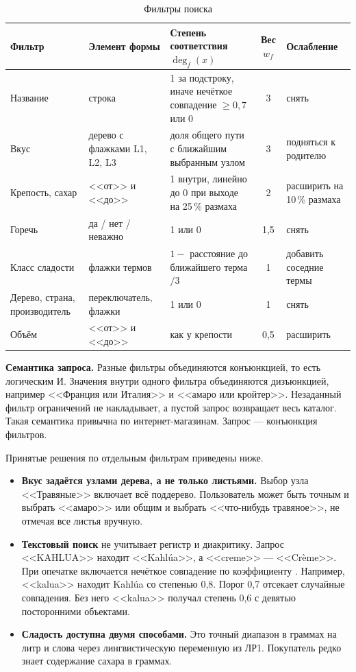 \begin{table}[H]
	\centering
	\caption{Фильтры поиска}
	\label{tab:lr4_filters}
	\footnotesize\setlength{\tabcolsep}{4pt}
	\begin{tabular}{|L{2.7cm}|L{2.7cm}|L{4.1cm}|c|L{2.5cm}|}
		\hline
		Фильтр & Элемент формы & Степень соответствия $\deg_f(x)$ & Вес $w_f$ & Ослабление \\ \hline
		Название & строка & 1 за подстроку, иначе нечёткое совпадение $\geq 0{,}7$ или 0 & 3 & снять \\ \hline
		Вкус & дерево с флажками L1, L2, L3 & доля общего пути с ближайшим выбранным узлом & 3 & подняться к родителю \\ \hline
		Крепость, сахар & <<от>> и <<до>> & 1 внутри, линейно до 0 при выходе на 25\,\% размаха & 2 & расширить на 10\,\% размаха \\ \hline
		Горечь & да / нет / неважно & 1 или 0 & 1,5 & снять \\ \hline
		Класс сладости & флажки термов & $1 - $ расстояние до ближайшего терма$/3$ & 1 & добавить соседние термы \\ \hline
		Дерево, страна, производитель & переключатель, флажки & 1 или 0 & 1 & снять \\ \hline
		Объём & <<от>> и <<до>> & как у крепости & 0,5 & расширить \\ \hline
	\end{tabular}
\end{table}

\textbf{Семантика запроса.} Разные фильтры объединяются конъюнкцией, то есть логическим И. Значения внутри одного фильтра объединяются дизъюнкцией, например <<Франция или Италия>> и <<амаро или кройтер>>. Незаданный фильтр ограничений не накладывает, а пустой запрос возвращает весь каталог. Такая семантика привычна по интернет-магазинам. Запрос --- конъюнкция фильтров.

Принятые решения по отдельным фильтрам приведены ниже.
\begin{itemize}[leftmargin=1.6\parindent, label*=---]
	\item \textbf{Вкус задаётся узлами дерева, а не только листьями.} Выбор узла <<Травяные>> включает всё поддерево. Пользователь может быть точным и выбрать <<амаро>> или общим и выбрать <<что-нибудь травяное>>, не отмечая все листья вручную.
	\item \textbf{Текстовый поиск} не учитывает регистр и диакритику. Запрос <<KAHLUA>> находит <<Kahl\'ua>>, а <<creme>> --- <<Cr\`eme>>. При опечатке включается нечёткое совпадение по коэффициенту . Например, <<kalua>> находит Kahl\'ua со степенью 0,8. Порог 0,7 отсекает случайные совпадения. Без него <<kalua>> получал степень 0,6 с девятью посторонними объектами.
	\item \textbf{Сладость доступна двумя способами.} Это точный диапазон в граммах на литр и слова через лингвистическую переменную из ЛР1. Покупатель редко знает содержание сахара в граммах.
\end{itemize}

